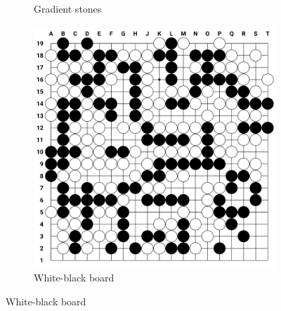 \documentclass{beamer}
\begin{document}
\begin{frame}[fragile]
\begin{figure}
\begin{subfigure}[b]{0.3\textwidth}
        \caption*{Gradient stones}
    \end{subfigure}
    \begin{subfigure}[b]{0.3\textwidth}
        \includegraphics[width=\textwidth]{images/style3.png}
        \caption*{White-black board}
    \end{subfigure}
\end{figure}
	
\end{frame}

\end{document}
